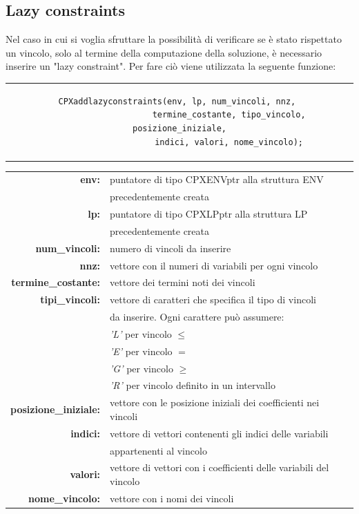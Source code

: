 \subsection{Lazy constraints}
Nel caso in cui si voglia sfruttare la possibilità di verificare se è stato rispettato un vincolo, solo al termine della computazione della soluzione, è necessario inserire un "lazy constraint". Per fare ciò viene utilizzata la seguente funzione:
\begin{center}
\begin{tabular}{c}
\begin{lstlisting}[linewidth=380pt, basicstyle=\footnotesize\sffamily,]     
CPXaddlazyconstraints(env, lp, num_vincoli, nnz, 
					termine_costante, tipo_vincolo, posizione_iniziale,
					indici, valori, nome_vincolo);
\end{lstlisting}
\end{tabular}
\end{center}
\begin{table}[h]
\begin{tabular}{rl}
\textbf{env:} & {puntatore di tipo CPXENVptr alla struttura ENV}\\
& {precedentemente creata}\\
\textbf{lp:} & {puntatore di tipo CPXLPptr alla struttura LP}\\
& {precedentemente creata}\\
\textbf{num\_vincoli:} & {numero di vincoli da inserire}\\
\textbf{nnz:} & {vettore con il numeri di variabili per ogni vincolo}\\ 
\textbf{termine\_costante:} & {vettore dei termini noti dei vincoli}\\
\textbf{tipi\_vincoli:} & {vettore di caratteri che specifica il tipo di vincoli}\\
&{da inserire. Ogni carattere può assumere:}\\
&{\textit{'L'} per vincolo $\leq$}\\
&{\textit{'E'} per vincolo $=$}\\
&{\textit{'G'} per vincolo $\geq$}\\
&{\textit{'R'} per vincolo definito in un intervallo}\\
\textbf{posizione\_iniziale:} & {vettore con le posizione iniziali dei coefficienti nei vincoli}\\
\textbf{indici:} & {vettore di vettori contenenti gli indici delle variabili }\\
& {appartenenti al vincolo}\\
\textbf{valori:} & {vettore di vettori con i coefficienti delle variabili del vincolo}\\
\textbf{nome\_vincolo:} & {vettore con i nomi dei vincoli}\\
\end{tabular}
\end{table}

